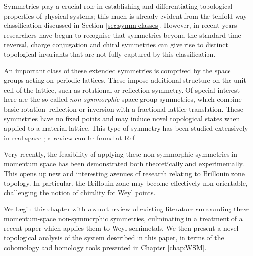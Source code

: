 \label{chap:non-orientable}

Symmetries play a crucial role in establishing and differentiating topological properties of physical systems; this much is already evident from the tenfold way classification discussed in Section \ref{sec:symm-classes}. However, in recent years researchers have begun to recognise that symmetries beyond the standard time reversal, charge conjugation and chiral symmetries can give rise to distinct topological invariants that are not fully captured by this classification.

An important class of these extended symmetries is comprised by the space groups acting on periodic lattices. These impose additional structure on the unit cell of the lattice, such as rotational or reflection symmetry. Of special interest here are the so-called \emph{non-symmorphic} space group symmetries, which combine basic rotation, reflection or inversion with a fractional lattice translation. These symmetries have no fixed points and may induce novel topological states when applied to a material lattice. This type of symmetry has been studied extensively in real space \cite{Wang_hourglass,Chen_nonsymmorphic-semimetal,Kim_glide-semimetal,Shiozaki_nonsymmorphic-topology,Bzdusek_nodal-chain,Wieder_layer-semimetal,Zhao_nonsymmorphic-semimetal,Yang_nonsymmorphic-semimetal,Wang_hourglass-semimetal,Wang_hourglass-Dirac,Wieder_wallpaper-fermions,Xiao_hourglass-Weyl}; a review can be found at Ref.~\cite{Zhang_nonsymmorphic-review}.

Very recently, the feasibility of applying these non-symmorphic symmetries in momentum space has been demonstrated both theoretically and experimentally. This opens up new and interesting avenues of research relating to Brillouin zone topology. In particular, the Brillouin zone may become effectively non-orientable, challenging the notion of chirality for Weyl points.

We begin this chapter with a short review of existing literature surrounding these momentum-space non-symmorphic symmetries, culminating in a treatment of a recent paper which applies them to Weyl semimetals. We then present a novel topological analysis of the system described in this paper, in terms of the cohomology and homology tools presented in Chapter \ref{chap:WSM}.



